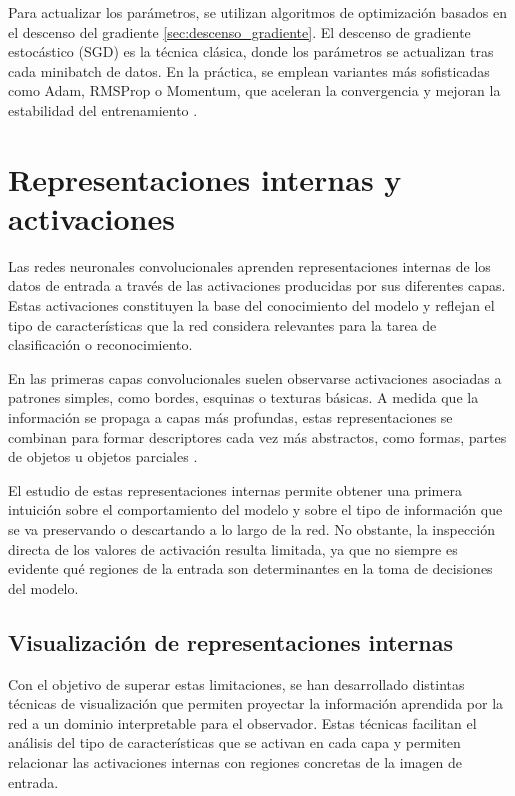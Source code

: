 Para actualizar los parámetros, se utilizan algoritmos de optimización basados en el descenso del gradiente \ref{sec:descenso_gradiente}. El descenso de gradiente estocástico (SGD) es la técnica clásica, donde los parámetros se actualizan tras cada minibatch de datos.
En la práctica, se emplean variantes más sofisticadas como Adam, RMSProp o Momentum, que aceleran la convergencia y mejoran la estabilidad del entrenamiento \cite{dl_python__chollet_2021}.

\section{Representaciones internas y activaciones}
\label{sec:representaciones_internas}

Las redes neuronales convolucionales aprenden representaciones internas de los datos de
entrada a través de las activaciones producidas por sus diferentes capas. Estas activaciones
constituyen la base del conocimiento del modelo y reflejan el tipo de características que la
red considera relevantes para la tarea de clasificación o reconocimiento.

En las primeras capas convolucionales suelen observarse activaciones asociadas a patrones
simples, como bordes, esquinas o texturas básicas. A medida que la información se propaga a
capas más profundas, estas representaciones se combinan para formar descriptores cada vez
más abstractos, como formas, partes de objetos u objetos parciales
\cite{dl_python__chollet_2021}.

El estudio de estas representaciones internas permite obtener una primera intuición sobre el
comportamiento del modelo y sobre el tipo de información que se va preservando o descartando
a lo largo de la red. No obstante, la inspección directa de los valores de activación resulta
limitada, ya que no siempre es evidente qué regiones de la entrada son determinantes en la
toma de decisiones del modelo.

\subsection{Visualización de representaciones internas}
\label{sec:visualizacion_representaciones}

Con el objetivo de superar estas limitaciones, se han desarrollado distintas técnicas de
visualización que permiten proyectar la información aprendida por la red a un dominio
interpretable para el observador. Estas técnicas facilitan el análisis del tipo de
características que se activan en cada capa y permiten relacionar las activaciones internas
con regiones concretas de la imagen de entrada.

